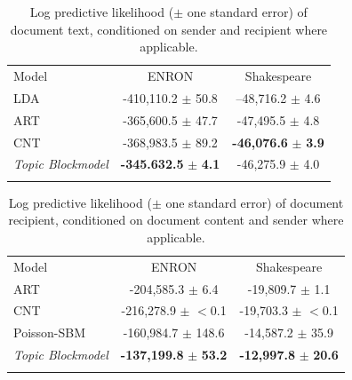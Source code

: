         \begin{table}[ht]
        	\caption{Log predictive likelihood ($\pm$ one standard error) of document text, conditioned on sender and recipient where applicable.}
        	\centering
        	\label{tab:topic_prediction}
        	\begin{tabular}{l c c}
        	Model & ENRON &  Shakespeare  \\
        	\noalign{\smallskip}\hline\noalign{\smallskip}
        	LDA	&				-410,110.2 	 $\pm$  50.8	&	--48,716.2	 $\pm$  4.6 \\
        	ART &				-365,600.5 	$\pm$  47.7	&	-47,495.5  $\pm$  4.8 \\
        	CNT	&			-368,983.5 	$\pm$  89.2	&	\textbf{-46,076.6} 	 $\mathbf{\pm}$  \textbf{3.9} \\
        	\textit{Topic Blockmodel}	&				\textbf{-345.632.5} 	$\mathbf{\pm}$  \textbf{4.1}	&	-46,275.9 $\pm$  4.0 \\
        	\noalign{\smallskip}\hline
        	\end{tabular}
        \end{table}
        
        \begin{table}[ht]
        	\caption{Log predictive likelihood ($\pm$ one standard error) of document recipient, conditioned on document content and sender where applicable.}
        	\centering
        	\label{tab:r_prediction}
        	\begin{tabular}{l c c}
        		Model & ENRON &  Shakespeare  \\ 
        		\noalign{\smallskip}\hline\noalign{\smallskip}
        		ART				& -204,585.3		$\pm$  6.4		&	-19,809.7 	$\pm$  1.1 \\
        		CNT			& -216,278.9		$\pm$   $<$0.1		&	-19,703.3 	$\pm$  $<$0.1 \\
        		 Poisson-SBM				& -160,984.7		$\pm$  148.6	&	-14,587.2	$\pm$  35.9 \\
        		\textit{Topic Blockmodel}			& \textbf{-137,199.8} $\mathbf{\pm}$  \textbf{53.2}	&	\textbf{-12,997.8} 	 $\mathbf{\pm}$  \textbf{20.6} \\
        	\noalign{\smallskip}\hline
        	\end{tabular}
        \end{table}
    
